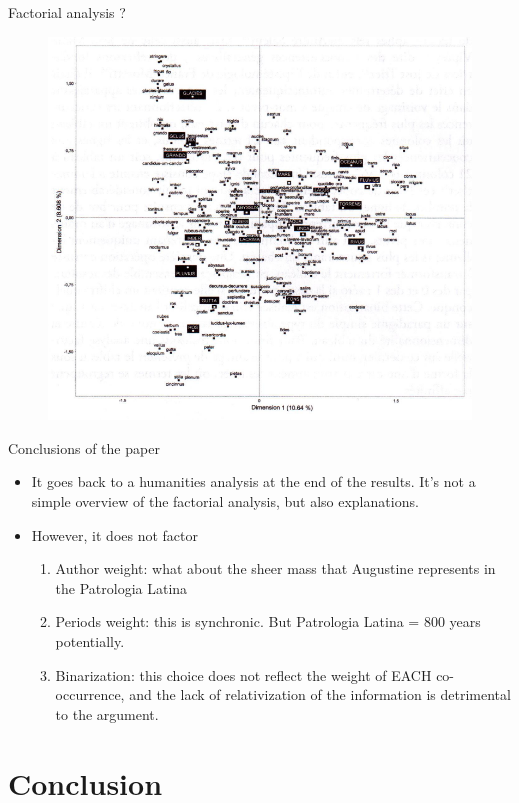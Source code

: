\documentclass[aspectratio=169]{beamer}
\begin{document}
\begin{frame}{Factorial analysis ?}
    \begin{figure}
        \centering
        \includegraphics[width=0.5\linewidth]{intro-to-ch/images/factorial.png}
    \end{figure}
\end{frame}

\begin{frame}{Conclusions of the paper}
    \begin{itemize}
        \item It goes back to a humanities analysis at the end of the results. It's not a simple overview of the factorial analysis, but also explanations.
        \item However, it does not factor
        \begin{enumerate}
            \item Author weight: what about the sheer mass that Augustine represents in the Patrologia Latina
            \item Periods weight: this is synchronic. But Patrologia Latina = 800 years potentially.
            \item Binarization: this choice does not reflect the weight of EACH co-occurrence, and the lack of relativization of the information is detrimental to the argument.
        \end{enumerate}
    \end{itemize}
\end{frame}

\section{Conclusion}
\end{document}
